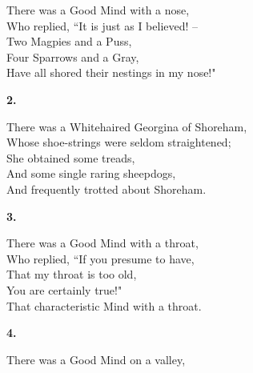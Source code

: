 \documentclass{book}
\begin{document}
{\hspace*{14mm}       There was a Good Mind with a nose, \\
\hspace*{14mm}       Who replied, ``It is just as \textsc{I} believed! --  \\
\hspace*{14mm}       Two Magpies and a Puss, \\
\hspace*{14mm}       Four Sparrows and a Gray, \\
\hspace*{14mm}       Have all shored their nestings in my nose!"
\begin{center}
\textbf{    2.}
\end{center}
\par
\noindent
\hspace*{14mm}       There was a Whitehaired Georgina of Shoreham, \\
\hspace*{14mm}       Whose shoe-strings were seldom straightened; \\
\hspace*{14mm}       She obtained some treads, \\
\hspace*{14mm}       And some single raring sheepdogs, \\
\hspace*{14mm}       And frequently trotted about Shoreham.
\begin{center}
\textbf{    3.}
\end{center}
\par
\noindent
\hspace*{14mm}       There was a Good Mind with a throat, \\
\hspace*{14mm}       Who replied, ``If you presume to have, \\
\hspace*{14mm}       That my throat is too old, \\
\hspace*{14mm}       You are certainly true!" \\
\hspace*{14mm}       That characteristic Mind with a throat.
\begin{center}
\textbf{    4.}
\end{center}
\par
\noindent
\hspace*{14mm}       There was a Good Mind on a valley, \\
}
\end{document}
